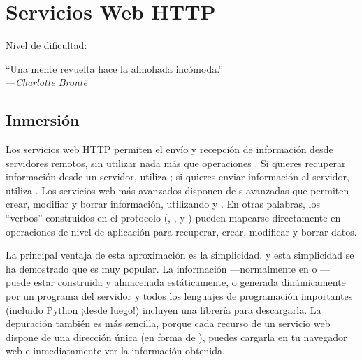 
\chapter{Servicios Web HTTP}\label{ch:servicios_web}

\noindent
Nivel de dificultad:\difllll

\begin{citaCap}
``Una mente revuelta hace la almohada incómoda.'' \\
---\emph{Charlotte Brontë}
\end{citaCap}

\section{Inmersión}

Los servicios web HTTP permiten el envío y recepción de información desde servidores remotos, sin utilizar nada más que operaciones . Si quieres recuperar información desde un servidor, utiliza ; si quieres enviar información al servidor, utiliza . Los servicios web  más avanzados disponen de s avanzadas que permiten crear, modifiar y borrar información, utilizando  y . En otras palabras, los ``verbos'' construidos en el protocolo  (, ,  y ) pueden mapearse directamente en operaciones de nivel de aplicación para recuperar, crear, modificar y borrar datos.

La principal ventaja de esta aproximación es la simplicidad, y esta simplicidad se ha demostrado que es muy popular. La información ---normalmente en  o --- puede estar construida y almacenada estáticamente, o generada dinámicamente por un programa del servidor y todos los lenguajes de programación importantes (incluido Python ¡desde luego!) incluyen una librería  para descargarla. La depuración también es más sencilla, porque cada recurso de un servicio web  dispone de una dirección única (en forma de ), puedes cargarla en tu navegador web e inmediatamente ver la información obtenida.


